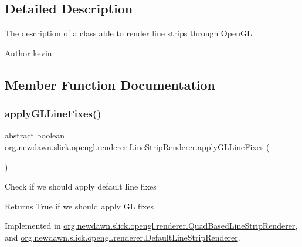 \subsection{Detailed Description}
The description of a class able to render line strips through Open\+GL

\begin{DoxyAuthor}{Author}
kevin 
\end{DoxyAuthor}


\subsection{Member Function Documentation}
\mbox{\label{interfaceorg_1_1newdawn_1_1slick_1_1opengl_1_1renderer_1_1_line_strip_renderer_a6cacd7974c575c5e49034a89a51492c2}} 
\subsubsection{\texorpdfstring{apply\+G\+L\+Line\+Fixes()}{applyGLLineFixes()}}
{\footnotesize\ttfamily abstract boolean org.\+newdawn.\+slick.\+opengl.\+renderer.\+Line\+Strip\+Renderer.\+apply\+G\+L\+Line\+Fixes (\begin{DoxyParamCaption}{ }\end{DoxyParamCaption})\hspace{0.3cm}{\ttfamily [abstract]}}

Check if we should apply default line fixes

\begin{DoxyReturn}{Returns}
True if we should apply GL fixes 
\end{DoxyReturn}


Implemented in \mbox{\hyperlink{classorg_1_1newdawn_1_1slick_1_1opengl_1_1renderer_1_1_quad_based_line_strip_renderer_a535a64f5cf41e3373c44d6afbc3036f1}{org.\+newdawn.\+slick.\+opengl.\+renderer.\+Quad\+Based\+Line\+Strip\+Renderer}}, and \mbox{\hyperlink{classorg_1_1newdawn_1_1slick_1_1opengl_1_1renderer_1_1_default_line_strip_renderer_ab8658df4f3b6dfae473b3c708dadfdfb}{org.\+newdawn.\+slick.\+opengl.\+renderer.\+Default\+Line\+Strip\+Renderer}}.

